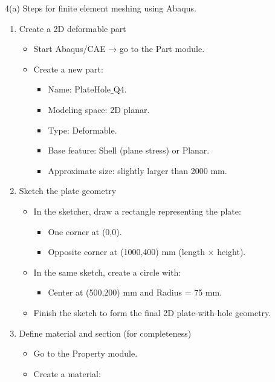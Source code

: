 \documentclass{homework}
\begin{document}
\begin{solution}
    4(a) Steps for finite element meshing using Abaqus. 
    \begin{enumerate}
        \item Create a 2D deformable part
        \begin{itemize}
            \item Start Abaqus/CAE → go to the Part module.
            \item Create a new part:
            \begin{itemize}
                \item Name: PlateHole$\_$Q4.
                \item Modeling space: 2D planar.
                \item Type: Deformable.
                \item Base feature: Shell (plane stress) or Planar.
                \item  Approximate size: slightly larger than 2000 mm.
            \end{itemize}
        \end{itemize}
        \item Sketch the plate geometry
        \begin{itemize}
            \item In the sketcher, draw a rectangle representing the plate:
            \begin{itemize}
                \item One corner at (0,0).
                \item Opposite corner at (1000,400) mm (length × height).
            \end{itemize}
            \item In the same sketch, create a circle with:
            \begin{itemize}
                \item Center at (500,200) mm and Radius = 75 mm.
            \end{itemize}
            \item Finish the sketch to form the final 2D plate-with-hole geometry.
        \end{itemize}
        \item Define material and section (for completeness)
        \begin{itemize}
            \item Go to the Property module.
            \item Create a material:
            \begin{itemize}

\end{itemize}
\end{itemize}
\end{enumerate}
\end{solution}
\end{document}
